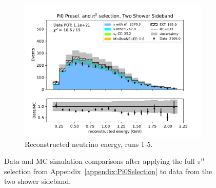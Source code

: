 \begin{figure}[H]
\begin{subfigure}{0.33\linewidth}
        \includegraphics[width=\linewidth]{technote/Sidebands/Figures/TwoShowerSideband/two_shr_sideband_reco_e_run1234b4c4d5_PI0_PI0.pdf}
        \caption{Reconstructed neutrino energy, runs 1-5.}
    \end{subfigure}
    \caption{Data and MC simulation comparisons after applying the full $\pi^0$ selection from Appendix~\ref{appendix:Pi0Selection} to data from the two shower sideband.}
    \label{fig:Pi0Sideband}
\end{figure}